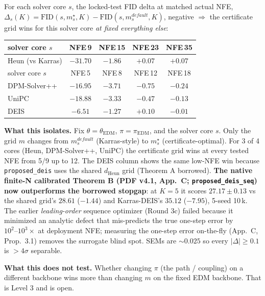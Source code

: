 \documentclass[11pt]{article}
\begin{document}
For each solver core \(s\), the locked-test FID delta at matched actual NFE,
\(\Delta_s(K) = \mathrm{FID}(s, m_s^\star, K) - \mathrm{FID}(s, m_s^{default}, K)\),
negative \(\Rightarrow\) the certificate grid wins for this solver core
\emph{at fixed everything else}:

\begin{center}
\small
\begin{tabular}{l c c c c}
\toprule
solver core \(s\) & NFE\,9 & NFE\,15 & NFE\,23 & NFE\,35 \\
\midrule
Heun (vs Karras)         & \(-31.70\) & \( -1.86\) & \(+0.07\) & \(+0.07\) \\
\midrule
solver core \(s\) & NFE\,5 & NFE\,8 & NFE\,12 & NFE\,18 \\
\midrule
DPM-Solver++         & \(-16.95\) & \( -3.71\) & \(-0.75\) & \(-0.24\) \\
UniPC                & \(-18.88\) & \( -3.33\) & \(-0.47\) & \(-0.13\) \\
DEIS                 & \( -6.51\) & \( -1.27\) & \(+0.10\) & \(-0.01\) \\
\bottomrule
\end{tabular}
\end{center}

\noindent
\textbf{What this isolates.} Fix \(\theta = \theta_{\mathrm{EDM}}\),
\(\pi = \pi_{\mathrm{EDM}}\), and the solver core \(s\). Only the
grid \(m\) changes from \(m_s^{default}\) (Karras-style) to \(m_s^\star\)
(certificate-optimal). For 3 of 4 cores (Heun, DPM-Solver++, UniPC) the
certificate grid wins at every tested NFE from 5/9 up to 12. The DEIS
column shows the same low-NFE win because \texttt{proposed\_deis} uses
the shared \(d_{\mathrm{Heun}}\) grid (Theorem A borrowed). \textbf{The
native finite-N calibrated Theorem B (PDF v4.1, App.~C;
\texttt{proposed\_deis\_seq}) now outperforms the borrowed stopgap}: at
\(K{=}5\) it scores \(27.17{\pm}0.13\) vs the shared grid's \(28.61\)
(\(-1.44\)) and Karras-DEIS's \(35.12\) (\(-7.95\)), 5-seed 10\,k. The
earlier \emph{leading-order} sequence optimizer (Round 3c) failed because
it minimized an analytic defect that mis-predicts the true one-step error
by \(10^2\text{--}10^3\times\) at deployment NFE; measuring the one-step
error on-the-fly (App.~C, Prop.~3.1) removes the surrogate blind spot.
SEMs are \(\sim 0.025\) so every \(|\Delta| \ge 0.1\) is \(>4\sigma\)
separable.

\noindent
\textbf{What this does not test.} Whether changing \(\pi\) (the path /
coupling) on a different backbone wins more than changing \(m\) on the
fixed EDM backbone. That is Level 3 and is open.
\end{document}
